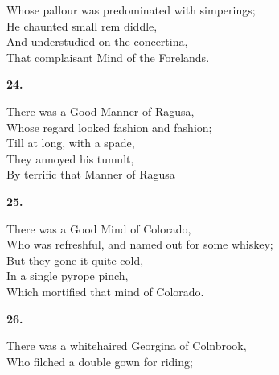 \documentclass{book}
\begin{document}
{\hspace*{14mm}       Whose pallour was predominated with simperings; \\
\hspace*{14mm}       He chaunted small rem diddle, \\
\hspace*{14mm}       And understudied on the concertina, \\
\hspace*{14mm}       That complaisant Mind of the Forelands.
\begin{center}
\textbf{    24.}
\end{center}
\par
\noindent
\hspace*{14mm}       There was a Good Manner of Ragusa, \\
\hspace*{14mm}       Whose regard looked fashion and fashion; \\
\hspace*{14mm}       Till at long, with a spade, \\
\hspace*{14mm}       They annoyed his tumult, \\
\hspace*{14mm}       By terrific that Manner of Ragusa
\begin{center}
\textbf{    25.}
\end{center}
\par
\noindent
\hspace*{14mm}       There was a Good Mind of Colorado, \\
\hspace*{14mm}       Who was refreshful, and named out for some whiskey; \\
\hspace*{14mm}       But they gone it quite cold, \\
\hspace*{14mm}       In a single pyrope pinch, \\
\hspace*{14mm}       Which mortified that mind of Colorado.
\begin{center}
\textbf{    26.}
\end{center}
\par
\noindent
\hspace*{14mm}       There was a whitehaired Georgina of Colnbrook, \\
\hspace*{14mm}       Who filched a double gown for riding; \\
}
\end{document}
